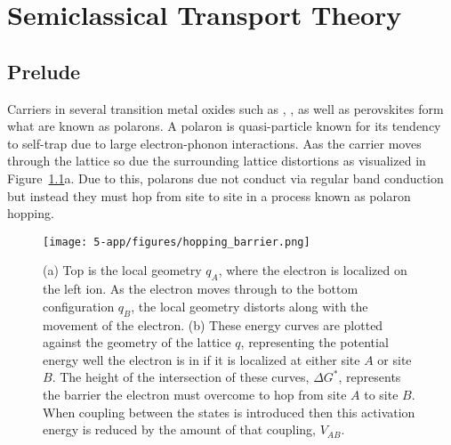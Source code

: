 \chapter{Semiclassical Transport Theory}

\section{Prelude}

Carriers in several transition metal oxides such as , , as well as  perovskites form what are known as polarons. A polaron is quasi-particle known for its tendency to self-trap due to large electron-phonon interactions.  Aas the carrier moves through the lattice so due the surrounding lattice distortions as visualized in Figure~\ref{app:fig:hop}a. Due to this, polarons due not conduct via regular band conduction but instead they must hop from site to site in a process known as polaron hopping.

\begin{figure}[H]
    \centering
    \texttt{[image: 5-app/figures/hopping\_barrier.png]}
    \caption{(a) Top is the local geometry $q_A$, where the electron is localized on the left ion. As the electron moves through to the bottom configuration $q_B$, the local geometry distorts along with the movement of the electron. (b) These energy curves are plotted against the geometry of the lattice $q$, representing the potential energy well the electron is in if it is localized at either site $A$ or site $B$. The height of the intersection of these curves, $\Delta G^*$, represents the barrier the electron must overcome to hop from site $A$ to site $B$. When coupling between the states is introduced then this activation energy is reduced by the amount of that coupling, $V_{AB}$.}
    \label{app:fig:hop}
\end{figure}

